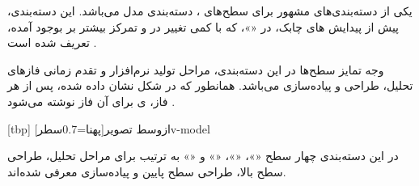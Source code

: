  یکی از دسته‌بندی‌های مشهور برای سطح‌های
، دسته‌بندی مدل  می‌باشد. این دسته‌بندی، پیش از پیدایش
‌های چابک، در  «»، که با کمی
تغییر در   و تمرکز بیشتر بر 
بوجود آمده، تعریف شده است .

وجه تمایز سطح‌ها در این دسته‌بندی، مراحل تولید نرم‌افزار و تقدم زمانی
فازهای تحلیل، طراحی و پیاده‌سازی می‌باشد. همانطور که در شکل
 نشان داده شده، پس از هر فاز، ی برای
 آن فاز نوشته می‌شود .

[tbp]
‌ازوسط
‌تصویر[پهنا=0.7‌سطر]{v-model}

در این دسته‌بندی چهار سطح «»، «»،
«» و «» به ترتیب برای مراحل تحلیل،
طراحی سطح بالا، طراحی سطح پایین و پیاده‌سازی معرفی شده‌اند.

